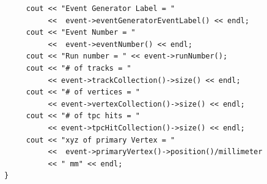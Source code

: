 \begin{Entry}
{\begin{verbatim}
     cout << "Event Generator Label = "
          <<  event->eventGeneratorEventLabel() << endl;
     cout << "Event Number = "
          <<  event->eventNumber() << endl;
     cout << "Run number = " << event->runNumber();
     cout << "# of tracks = "
          << event->trackCollection()->size() << endl;
     cout << "# of vertices = "
          << event->vertexCollection()->size() << endl;
     cout << "# of tpc hits = "
          << event->tpcHitCollection()->size() << endl;
     cout << "xyz of primary Vertex = "
          <<  event->primaryVertex()->position()/millimeter
          << " mm" << endl;
}

\end{verbatim}
}%


\end{Entry}
\clearpage

%
%
